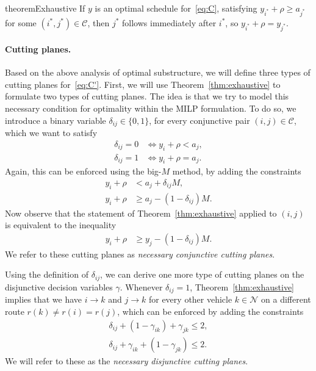 \documentclass[a4paper]{report}
\theoremstyle{definition}
\theoremstyle{plain}
\begin{document}
\begin{restatable}{theorem}{Exhaustive}\label{thm:exhaustive}
  If $y$ is an optimal schedule for~\eqref{eq:C},
  satisfying $y_{i^{*}} + \rho \geq a_{j^{*}}$ for some $(i^{*},j^{*}) \in \mathcal{C}$, then $j^{*}$
  follows immediately after $i^{*}$, so $y_{i^{*}} + \rho = y_{j^{*}}$.
\end{restatable}

\paragraph{Cutting planes.}
Based on the above analysis of optimal substructure, we will define three types
of cutting planes for~\eqref{eq:C'}.
%
First, we will use Theorem~\ref{thm:exhaustive} to formulate two types of
cutting planes. The idea is that we try to model this necessary condition for
optimality within the MILP formulation. To do so, we introduce a binary variable
$\delta_{ij} \in \{0, 1\}$, for every conjunctive pair $(i,j) \in \mathcal{C}$, which we
want to satisfy
\begin{align*}
  \delta_{ij} = 0 &\iff y_{i} + \rho < a_{j} , \\
  \delta_{ij} = 1 &\iff y_{i} + \rho = a_{j} .
\end{align*}
Again, this can be enforced using the big-$M$ method, by adding the constraints
\begin{subequations}
\begin{align}
  y_{i} + \rho &< a_{j} + \delta_{ij}M ,  \\
  y_{i} + \rho &\geq a_{j} - (1 - \delta_{ij}) M .
\end{align}
\end{subequations}
Now observe that the statement of Theorem~\ref{thm:exhaustive} applied to $(i,j)$ is equivalent
to the inequality
\begin{align}
  y_{i} + \rho &\geq y_{j} - (1 - \delta_{ij}) M \tag{conj.cut} .
\end{align}
We refer to these cutting planes as \textit{necessary conjunctive cutting planes}.

Using the definition of $\delta_{ij}$, we can derive one more type of cutting planes
on the disjunctive decision variables $\gamma$. Whenever $\delta_{ij} = 1$,
Theorem~\ref{thm:exhaustive} implies that we have $i \rightarrow k$ and $j \rightarrow k$ for every
other vehicle $k \in \mathcal{N}$ on a different route $r(k) \neq r(i) = r(j)$,
which can be enforced by adding the constraints
\begin{subequations}
\begin{align}
  \delta_{ij} + (1 - \gamma_{ik}) + \gamma_{jk} \leq 2 , \tag{disj.cut.1} \\
  \delta_{ij} + \gamma_{ik} + (1 - \gamma_{jk}) \leq 2 . \tag{disj.cut.2}
\end{align}
\end{subequations}
We will refer to these as the \textit{necessary disjunctive cutting planes}.
\end{document}
